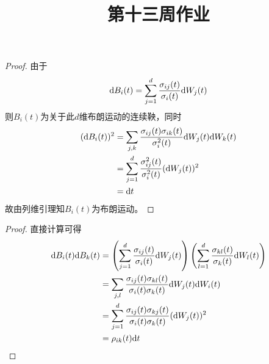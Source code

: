 \documentclass[cn]{homework}
\title{第十三周作业}
\begin{document}
    \maketitle

    \problem[习题4.15]
    \begin{subproblem}
        \item
        \begin{proof}
            由于
            \[\mathrm d B_i(t)=
            \sum_{j=1}^d\frac{\sigma_{ij}(t)}{\sigma_i(t)}\mathrm d W_j(t)\]
            则$B_i(t)$为关于此$d$维布朗运动的连续鞅，同时
            \[\begin{aligned}
                (\mathrm d B_i(t))^2
                &=\sum_{j,k}\frac{\sigma_{ij}(t)\sigma_{ik}(t)}{\sigma_i^2(t)}
                \mathrm d W_j(t)\mathrm d W_k(t)\\
                &=\sum_{j=1}^d\frac{\sigma_{ij}^2(t)}{\sigma_i^2(t)}(\mathrm d W_j(t))^2\\
                &=\mathrm d t
            \end{aligned}\]
            故由列维引理知$B_i(t)$为布朗运动。
        \end{proof}

        \item
        \begin{proof}
            直接计算可得
            \[\begin{aligned}
                \mathrm d B_i(t)\mathrm d B_k(t)
                &=\left(\sum_{j=1}^d\frac{\sigma_{ij}(t)}{\sigma_i(t)}\mathrm d W_j(t)\right)
                \left(\sum_{l=1}^d\frac{\sigma_{kl}(t)}{\sigma_k(t)}\mathrm d W_l(t)\right)\\
                &=\sum_{j,l}\frac{\sigma_{ij}(t)\sigma_{kl}(t)}{\sigma_i(t)\sigma_k(t)}
                \mathrm d W_j(t)\mathrm d W_i(t)\\
                &=\sum_{j=1}^d\frac{\sigma_{ij}(t)\sigma_{kj}(t)}{\sigma_i(t)\sigma_k(t)}
                (\mathrm d W_j(t))^2\\
                &=\rho_{ik}(t)\mathrm d t
            \end{aligned}\]
        \end{proof}
    \end{subproblem}
\end{document}
